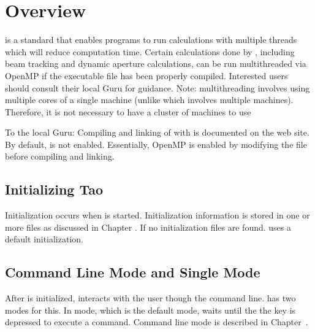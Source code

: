 \chapter{Overview}
\label{c:overview.tao}

\label{s:openmp}

 is a standard that enables programs to run calculations with multiple threads which will
reduce computation time. Certain calculations done by \tao, including beam tracking and dynamic
aperture calculations, can be run multithreaded via OpenMP if the \tao executable file has been
properly compiled.  Interested users should consult their local \bmad Guru for guidance. Note:
 multithreading involves using multiple cores of a single machine (unlike 
which involves multiple machines). Therefore, it is not necessary to have a cluster of machines to
use 

To the local \bmad Guru: Compiling and linking of \tao with  is documented on the \bmad
web site. By default,  is not enabled. Essentially, OpenMP is enabled by modifying
the  file before compiling and linking.

\section{Initializing Tao}
\label{s:initializing}

Initialization occurs when \tao is started. Initialization information is stored in one or more
files as discussed in Chapter . If no initialization files are found. \tao uses a
default initialization.

\section{Command Line Mode and Single Mode}
\label{s:modes}

After \tao is initialized, \tao interacts with the user though the command line. \tao has two modes
for this. In  mode, which is the default mode, \tao waits until the the 
key is depressed to execute a command. Command line mode is described in Chapter~. 

